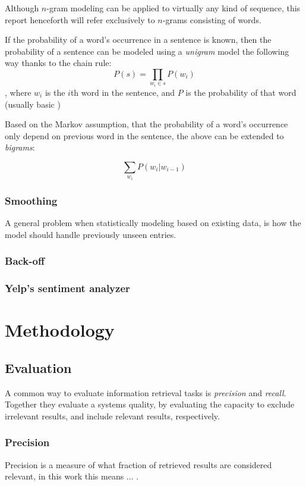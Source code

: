\documentclass[a4paper,11pt]{kth-mag}
\newcommand{\todo}{ ... }
\newcommand{\ngram}{$n$-gram }
\newcommand{\ngrams}{$n$-grams }
\begin{document}
Although \ngram modeling can be applied to virtually any kind of sequence, this report henceforth will refer exclusively to \ngrams consisting of words.

If the probability of a word's occurrence in a sentence is known, then the probability of a sentence can be modeled using a \emph{unigram} model the following way thanks to the chain rule:
$$P(s) = \prod_{w_i \in s}P(w_i)$$, where $w_i$ is the $i$th word in the sentence, and $P$ is the probability of that word (usually basic )

Based on the Markov assumption, that the probability of a word's occurrence only depend on previous word in the sentence, the above can be extended to \emph{bigrams}:

$$\sum_{w_i}P(w_i|w_{i-1})$$

\subsection{Smoothing}
A general problem when statistically modeling based on existing data, is how the model should handle previously unseen entries.


\subsection{Back-off}

\subsection{Yelp's sentiment analyzer}

\chapter{Methodology}
\section{Evaluation}
A common way to evaluate information retrieval tasks is \emph{precision} and \emph{recall}. Together they evaluate a systems quality, by evaluating the capacity to exclude irrelevant results, and include relevant results, respectively.

\subsection{Precision}
Precision is a measure of what fraction of retrieved results are considered relevant, in this work this means \todo.
\end{document}
